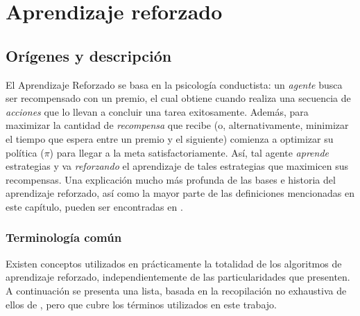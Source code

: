 \chapter{Aprendizaje reforzado}

\section{Or\'igenes y descripci\'on}

El Aprendizaje Reforzado se basa en la psicolog\'ia conductista: un \textit{agente} busca ser recompensado con un premio, el cual obtiene cuando realiza una secuencia de \textit{acciones} que lo llevan a concluir una tarea exitosamente. Adem\'as, para maximizar la cantidad de \textit{recompensa} que recibe (o, alternativamente, minimizar el tiempo que espera entre un premio y el siguiente) comienza a optimizar su pol\'itica (\textit{$\pi$}) para llegar a la meta satisfactoriamente. As\'i, tal agente \textit{aprende} estrategias y va \textit{reforzando} el aprendizaje de tales estrategias que maximicen sus recompensas. Una explicaci\'on mucho m\'as profunda de las bases e historia del aprendizaje reforzado, as\'i como la mayor parte de las definiciones mencionadas en este cap\'itulo, pueden ser encontradas en \citet{Sutton}.\\

\subsection{Terminolog\'ia com\'un}

Existen conceptos utilizados en pr\'acticamente la totalidad de los algoritmos de aprendizaje reforzado, independientemente de las particularidades que presenten. A continuaci\'on se presenta una lista, basada en la recopilaci\'on no exhaustiva de ellos de \citet{rlexplained}, pero que cubre los t\'erminos utilizados en este trabajo.


